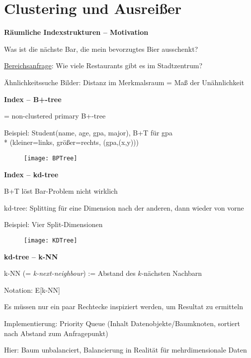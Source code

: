 \section{Clustering und Ausreißer}
\label{sec:clustering}

\textbf{Räumliche Indexstrukturen -- Motivation}
\begin{items}
	\item Was ist die nächste Bar, die mein bevorzugtes Bier ausschenkt?
	\item \underline{Bereichsanfrage}: Wie viele Restaurants gibt es im Stadtzentrum?
	\item Ähnlichkeitssuche Bilder: Distanz im Merkmalsraum = Maß der Unähnlichkeit
\end{items}

\textbf{Index -- B+-tree}
\begin{items}
	\item = non-clustered primary B+-tree
	\item Beispiel: Student(name, age, gpa, major), B+T für gpa \\* (kleiner=links, größer=rechts, (gpa,(x,y)))
	\begin{figure}[H]\centering\label{BPTree}\texttt{[image: BPTree]}\end{figure}
\end{items}

\newpage

\textbf{Index -- kd-tree}
\begin{items}
	\item B+T löst Bar-Problem nicht wirklich
	\item kd-tree: Splitting für eine Dimension nach der anderen, dann wieder von vorne
	\item Beispiel: Vier Split-Dimensionen
\end{items}
\begin{figure}[H]\centering\label{KDTree}\texttt{[image: KDTree]}\end{figure}

\textbf{kd-tree -- k-NN}
\begin{items}
	\item k-NN (= \emph{k-next-neighbour}) := Abstand des \( k \)-nächsten Nachbarn
	\item Notation: E[k-NN]
	\item Es müssen nur ein paar Rechtecke inspiziert werden, um Resultat zu ermitteln
	\item Implementierung: Priority Queue (Inhalt Datenobjekte/Baumknoten, sortiert nach Abstand zum Anfragepunkt)
	\item Hier: Baum unbalanciert, Balancierung in Realität für mehrdimensionale Daten
\end{items}

